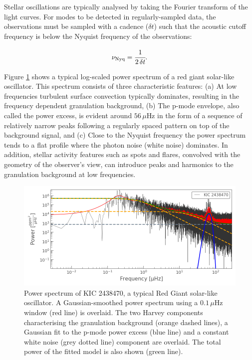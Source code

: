 Stellar oscillations are typically analysed by taking the Fourier transform of the light curves. For modes to be detected in regularly-sampled data, the observations must be sampled with a cadence ($\delta t$) such that the acoustic cutoff frequency is below the Nyquist frequency of the observations:

\begin{equation}
    \nu_{\mathrm{Nyq}} = \cfrac{1}{2\,\delta t} .
    \label{eqtn:nyq}
\end{equation}

Figure \ref{fig:rgps} shows a typical log-scaled power spectrum of a red giant solar-like oscillator. This spectrum consists of three characteristic features: (a) At low frequencies turbulent surface convection typically dominates, resulting in the frequency dependent granulation background, (b) The p-mode envelope, also called the power excess, is evident around $56\,\mu$Hz in the form of a sequence of relatively narrow peaks following a regularly spaced pattern on top of the background signal, and (c) Close to the Nyquist frequency the power spectrum tends to a flat profile where the photon noise (white noise) dominates. In addition, stellar activity features such as spots and flares, convolved with the geometry of the observer's view, can introduce peaks and harmonics to the granulation background at low frequencies.

\begin{figure}
    \centering
    \includegraphics[width=0.99\linewidth]{Chapter5/2438470_ps_harvey.png}
    \caption[Power spectrum of a typical Red Giant solar-like oscillator]{Power spectrum of KIC 2438470, a typical Red Giant solar-like oscillator. A Gaussian-smoothed power spectrum using a $0.1\,\mu$Hz window (red line) is overlaid. The two Harvey components characterising the granulation background (orange dashed lines), a Gaussian fit to the p-mode power excess (blue line) and a constant white noise (grey dotted line) component are overlaid. The total power of the fitted model is also shown (green line).}
    \label{fig:rgps}
\end{figure}

